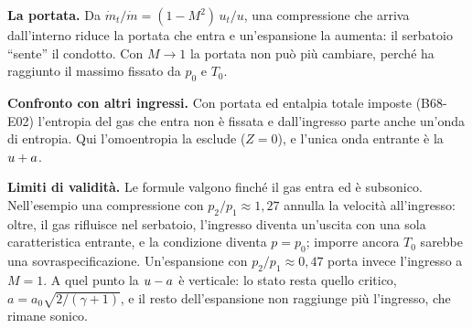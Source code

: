 \textbf{La portata.} Da $\dot m_t/\dot m=(1-M^2)\,u_t/u$, una compressione che arriva dall'interno riduce la portata
che entra e un'espansione la aumenta: il serbatoio ``sente'' il condotto. Con $M\to1$ la portata non può più
cambiare, perché ha raggiunto il massimo fissato da $p_0$ e $T_0$.

\textbf{Confronto con altri ingressi.} Con portata ed entalpia totale imposte (B68-E02) l'entropia del gas che entra
non è fissata e dall'ingresso parte anche un'onda di entropia. Qui l'omoentropia la esclude ($Z=0$), e l'unica onda
entrante è la $u+a$.

\textbf{Limiti di validità.} Le formule valgono finché il gas entra ed è subsonico. Nell'esempio una compressione
con $p_2/p_1\approx1{,}27$ annulla la velocità all'ingresso: oltre, il gas rifluisce nel serbatoio, l'ingresso
diventa un'uscita con una sola caratteristica entrante, e la condizione diventa $p=p_0$; imporre ancora $T_0$ sarebbe
una sovraspecificazione. Un'espansione con $p_2/p_1\approx0{,}47$ porta invece l'ingresso a $M=1$. A quel punto la
$u-a$ è verticale: lo stato resta quello critico, $a=a_0\sqrt{2/(\gamma+1)}$, e il resto dell'espansione non
raggiunge più l'ingresso, che rimane sonico.


